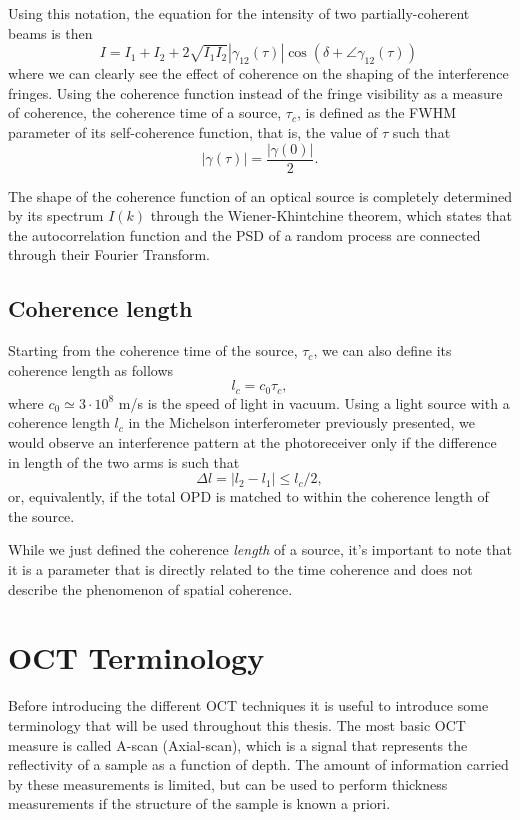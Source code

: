 Using this notation, the equation for the intensity of two partially-coherent beams is then
\begin{equation}
	I = I_1 + I_2 + 2\sqrt{I_1I_2}|\gamma_{12}(\tau)| \cos( \delta + \angle \gamma_{12}(\tau) )\,
\end{equation}
where we can clearly see the effect of coherence on the shaping of the interference fringes. Using the coherence function instead of the fringe visibility as a measure of coherence, the coherence time of a source, $\tau_c$, is defined as the \ac{FWHM} parameter of its self-coherence function, that is, the value of $\tau$ such that
\begin{equation}
	|\gamma(\tau)| = \frac{|\gamma(0)|}{2}.
\end{equation}

The shape of the coherence function of an optical source is completely determined by its spectrum $I(k)$ through the Wiener-Khintchine theorem, which states that the autocorrelation function and the \ac{PSD} of a random process are connected through their Fourier Transform. 




\subsection{Coherence length}

Starting from the coherence time of the source, $\tau_c$, we can also define its coherence length as follows
\begin{equation}
	l_c = c_0 \tau_c,
\end{equation}
where $c_0 \simeq 3\cdot10^8$ m/s is the speed of light in vacuum. Using a light source with a coherence length $l_c$ in the Michelson interferometer previously presented, we would observe an interference pattern at the photoreceiver only if the difference in length of the two arms is such that 
\begin{equation}
\Delta l = |l_2 - l_1| \leq l_c / 2,
\end{equation}
or, equivalently, if the total \ac{OPD} is matched to within the coherence length of the source. 


While we just defined the coherence \emph{length} of a source, it's important to note that it is a parameter that is directly related to the time coherence and does not describe the phenomenon of spatial coherence. 

\section{OCT Terminology}
Before introducing the different OCT techniques it is useful to introduce some terminology that will be used throughout this thesis. The most basic OCT measure is called A-scan (Axial-scan), which is a signal that represents the reflectivity of a sample as a function of depth. The amount of information carried by these measurements is limited, but can be used to perform thickness measurements if the structure of the sample is known a priori. 

